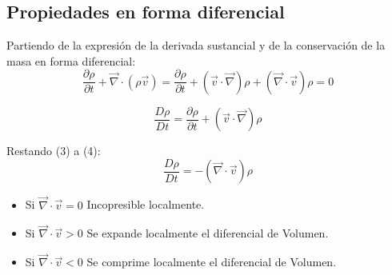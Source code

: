 \subsection{Propiedades en forma diferencial}
Partiendo de la expresión de la derivada sustancial y de la conservación de la masa en forma diferencial:
\begin{equation} \label{eq:1}
	\frac{\partial \rho}{\partial t} +\vec{\nabla}\cdot\left(\rho\vec{v}\right)=\frac{\partial \rho}{\partial t} +\left(\vec{v}\cdot\vec{\nabla}\right)\rho+\left(\vec{\nabla}\cdot\vec{v}\right)\rho=0
\end{equation}

\begin{equation} \label{eq:4}
	\frac{D \rho}{D t}=\frac{ \partial \rho}{\partial t}+\left(\vec{v}\cdot\vec{\nabla}\right)\rho
\end{equation}

Restando (3) a (4):
\[\frac{D \rho}{D t}=-\left(\vec{\nabla}\cdot\vec{v}\right)\rho\]
\begin{itemize}
	\item Si $\vec{\nabla}\cdot\vec{v} =0 $ Incopresible localmente.
	\item Si $\vec{\nabla}\cdot\vec{v} >0$ Se expande localmente el diferencial de Volumen.
	\item Si $\vec{\nabla}\cdot\vec{v} <0$ Se comprime localmente el diferencial de Volumen.
\end{itemize}
